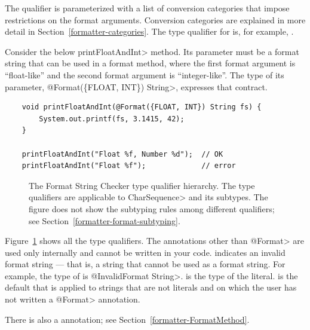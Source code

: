 The  qualifier is parameterized with
a list of conversion categories that impose restrictions on the format arguments.
Conversion categories are explained in more detail in
Section~\ref{formatter-categories}.  The type qualifier for  is,
for example, .

Consider the below \<printFloatAndInt> method.  Its parameter must be a
format string that can be used in a format method, where the first format
argument is ``float-like'' and the second format argument is
``integer-like''.  The type of its parameter, \<@Format(\{FLOAT, INT\})
String>, expresses that contract.

\begin{Verbatim}
    void printFloatAndInt(@Format({FLOAT, INT}) String fs) {
        System.out.printf(fs, 3.1415, 42);
    }

    printFloatAndInt("Float %f, Number %d");  // OK
    printFloatAndInt("Float %f");             // error
\end{Verbatim}

\begin{figure}
\caption{The
  Format String Checker type qualifier hierarchy.
  The type qualifiers are applicable to \<CharSequence> and its subtypes.
  The figure does not show the subtyping rules among different
  qualifiers; see
  Section~\ref{formatter-format-subtyping}.
}
\label{fig-formatter-hierarchy}
\end{figure}

Figure~\ref{fig-formatter-hierarchy} shows all the type qualifiers.
The annotations other than \<@Format> are used only
internally and cannot be written in your code.
 indicates an invalid format
string --- that is, a string that cannot be used as a format string.  For
example, the type of  is \<@InvalidFormat String>.
 is the type of the
 literal.
 is the default that is
applied to strings that are not literals and on which the user has not
written a \<@Format> annotation.

There is also a 
annotation; see Section~\ref{formatter-FormatMethod}.




